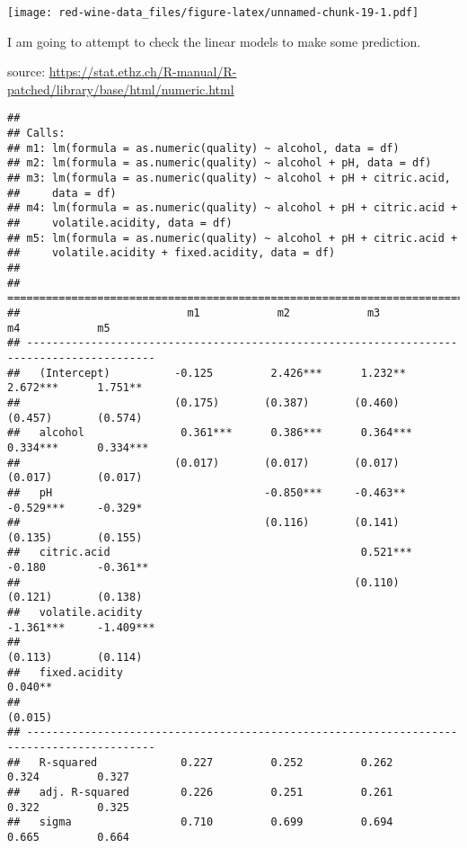 \documentclass[]{article}
\begin{document}
\texttt{[image: red-wine-data\_files/figure-latex/unnamed-chunk-19-1.pdf]}

I am going to attempt to check the linear models to make some
prediction.

source:
\url{https://stat.ethz.ch/R-manual/R-patched/library/base/html/numeric.html}

\begin{verbatim}
## 
## Calls:
## m1: lm(formula = as.numeric(quality) ~ alcohol, data = df)
## m2: lm(formula = as.numeric(quality) ~ alcohol + pH, data = df)
## m3: lm(formula = as.numeric(quality) ~ alcohol + pH + citric.acid, 
##     data = df)
## m4: lm(formula = as.numeric(quality) ~ alcohol + pH + citric.acid + 
##     volatile.acidity, data = df)
## m5: lm(formula = as.numeric(quality) ~ alcohol + pH + citric.acid + 
##     volatile.acidity + fixed.acidity, data = df)
## 
## ==========================================================================================
##                          m1            m2            m3            m4            m5       
## ------------------------------------------------------------------------------------------
##   (Intercept)          -0.125         2.426***      1.232**       2.672***      1.751**   
##                        (0.175)       (0.387)       (0.460)       (0.457)       (0.574)    
##   alcohol               0.361***      0.386***      0.364***      0.334***      0.334***  
##                        (0.017)       (0.017)       (0.017)       (0.017)       (0.017)    
##   pH                                 -0.850***     -0.463**      -0.529***     -0.329*    
##                                      (0.116)       (0.141)       (0.135)       (0.155)    
##   citric.acid                                       0.521***     -0.180        -0.361**   
##                                                    (0.110)       (0.121)       (0.138)    
##   volatile.acidity                                               -1.361***     -1.409***  
##                                                                  (0.113)       (0.114)    
##   fixed.acidity                                                                 0.040**   
##                                                                                (0.015)    
## ------------------------------------------------------------------------------------------
##   R-squared             0.227         0.252         0.262         0.324         0.327     
##   adj. R-squared        0.226         0.251         0.261         0.322         0.325     
##   sigma                 0.710         0.699         0.694         0.665         0.664     

\end{verbatim}
\end{document}
